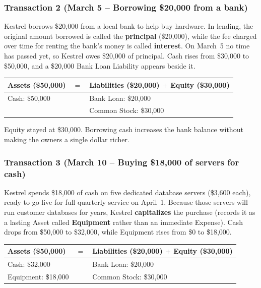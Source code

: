 \subsubsection*{Transaction 2 (March 5 -- Borrowing \$20,000 from a bank)}
Kestrel borrows \$20,000 from a local bank to help buy hardware. In lending, the original amount borrowed is called the \textbf{principal} (\$20,000), while the fee charged over time for renting the bank's money is called \textbf{interest}. On March~5 no time has passed yet, so Kestrel owes \$20,000 of principal. Cash rises from \$30,000 to \$50,000, and a \$20,000 Bank Loan Liability appears beside it.

\begin{center}
\small
\begin{tabular}{@{}lcl@{}}
\toprule
\textbf{Assets (\$50,000)} & $=$ & \textbf{Liabilities (\$20,000) $+$ Equity (\$30,000)} \\
\midrule
Cash: \$50,000 & & Bank Loan: \$20,000 \\
               & & Common Stock: \$30,000 \\
\bottomrule
\end{tabular}
\end{center}

Equity stayed at \$30,000. Borrowing cash increases the bank balance without making the owners a single dollar richer.

\subsubsection*{Transaction 3 (March 10 -- Buying \$18,000 of servers for cash)}
Kestrel spends \$18,000 of cash on five dedicated database servers (\$3,600 each), ready to go live for full quarterly service on April~1. Because those servers will run customer databases for years, Kestrel \textbf{capitalizes} the purchase (records it as a lasting Asset called \textbf{Equipment} rather than an immediate Expense). Cash drops from \$50,000 to \$32,000, while Equipment rises from \$0 to \$18,000.

\begin{center}
\small
\begin{tabular}{@{}lcl@{}}
\toprule
\textbf{Assets (\$50,000)} & $=$ & \textbf{Liabilities (\$20,000) $+$ Equity (\$30,000)} \\
\midrule
Cash: \$32,000      & & Bank Loan: \$20,000 \\
Equipment: \$18,000 & & Common Stock: \$30,000 \\
\bottomrule
\end{tabular}
\end{center}

